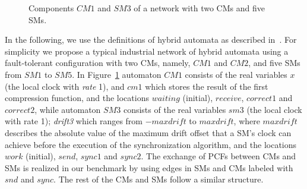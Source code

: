 \begin{figure}[t]

\vspace*{-1em}
\caption{Components $\mathit{CM1}$ and $\mathit{SM3}$ of a network with two CMs and five SMs.}
\label{fig1}
\end{figure}%

In the following, we use the definitions of hybrid automata as described in~\cite{Herrera3}.
For simplicity we propose a typical industrial network of hybrid automata using a fault-tolerant configuration
with two CMs, namely, $\mathit{CM1}$ and $\mathit{CM2}$, 
and five SMs from $\mathit{SM1}$ to $\mathit{SM5}$. 
In Figure~\ref{fig1} automaton $\mathit{CM1}$ consists of the 
real variables $x$ (the local clock with \emph{rate} 1), and $\mathit{cm1}$ which stores the result of the first compression function, and 
the locations $\mathit{waiting}$ (initial), $\mathit{receive}$, $\mathit{correct1}$ and $\mathit{correct2}$, while 
automaton $\mathit{SM3}$ consists of the real variables $\mathit{sm3}$ (the local clock with rate 1);  \emph{drift3}  which ranges from 
$-\mathit{maxdrift}$ to $\mathit{maxdrift}$, where $\mathit{maxdrift}$ describes the absolute value of the maximum 
drift offset that a SM's clock can achieve before the execution of the synchronization algorithm, 
and the locations $\mathit{work}$ (initial), $\mathit{send}$, $\mathit{sync1}$ 
and $\mathit{sync2}$. The exchange of PCFs between CMs and SMs is realized in our benchmark
by using edges in SMs and CMs labeled with $\mathit{snd}$ and $\mathit{sync}$. 
The rest of the CMs and SMs follow a similar structure.

